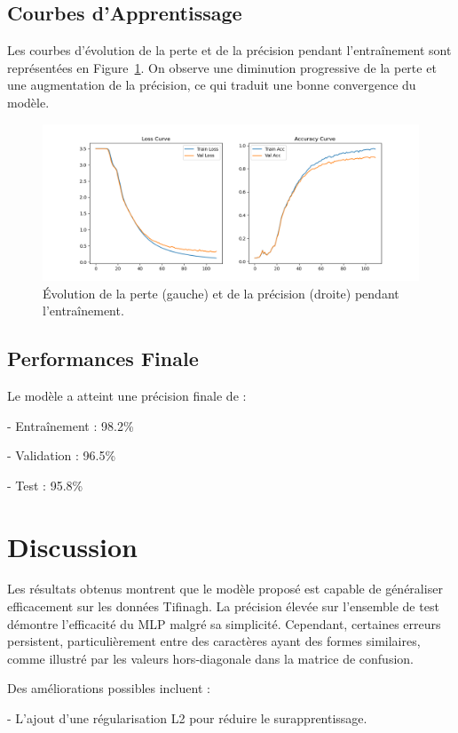 \documentclass[12pt,a4paper]{article}
\begin{document}
	\subsection{Courbes d'Apprentissage}
	Les courbes d’évolution de la perte et de la précision pendant l’entraînement sont représentées en Figure~\ref{fig:lossacc}. On observe une diminution progressive de la perte et une augmentation de la précision, ce qui traduit une bonne convergence du modèle.
	
	\begin{figure}
		\centering
		\includegraphics[width=0.9\linewidth]{training_curves.png}
		\caption{Évolution de la perte (gauche) et de la précision (droite) pendant l'entraînement.}
		\label{fig:lossacc}
	\end{figure}
	
	\subsection{Performances Finale}
	Le modèle a atteint une précision finale de :
	
	
	- Entraînement : 98.2\%
	
	- Validation : 96.5\%
	
	- Test : 95.8\%
	
	
	\section{Discussion}
	Les résultats obtenus montrent que le modèle proposé est capable de généraliser efficacement sur les données Tifinagh. La précision élevée sur l'ensemble de test démontre l'efficacité du MLP malgré sa simplicité. Cependant, certaines erreurs persistent, particulièrement entre des caractères ayant des formes similaires, comme illustré par les valeurs hors-diagonale dans la matrice de confusion.
	
	Des améliorations possibles incluent :
	
	
	- L’ajout d’une régularisation L2 pour réduire le surapprentissage.
	
\end{document}
